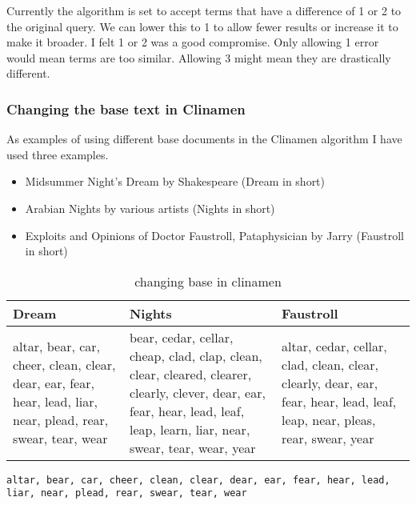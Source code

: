 Currently the algorithm is set to accept terms that have a difference of 1 or 2 to the original query. We can lower this to 1 to allow fewer results or increase it to make it broader. I felt 1 or 2 was a good compromise. Only allowing 1 error would mean terms are too similar. Allowing 3 might mean they are drastically different.



\subsubsection{Changing the base text in Clinamen}
\label{s:basetext}

As examples of using different base documents in the Clinamen algorithm I have used three examples. 

\begin{itemize}
  \item Midsummer Night's Dream by Shakespeare (Dream in short)
  \item Arabian Nights by various artists (Nights in short)
  \item Exploits and Opinions of Doctor Faustroll, Pataphysician by Jarry (Faustroll in short)
\end{itemize}

\begin{table}
  \centering
  \begin{tabu}{X[l]X[1.5,l]X[l]}
  \toprule
  \textbf{Dream} & \textbf{Nights} & \textbf{Faustroll}\\
  \midrule
  altar, bear, car, cheer, clean, clear, dear, ear, fear, hear, lead, liar, near, plead, rear, swear, tear, wear & bear, cedar, cellar, cheap, clad, clap, clean, clear, cleared, clearer, clearly, clever, dear, ear, fear, hear, lead, leaf, leap, learn, liar, near, swear, tear, wear, year & altar, cedar, cellar, clad, clean, clear, clearly, dear, ear, fear, hear, lead, leaf, leap, near, pleas, rear, swear, year\\
  \bottomrule
  \end{tabu}
\caption[Changing base in clinamen]{changing base in clinamen}
\label{tab:baseclear}
\end{table}

\begin{verbatim}
altar, bear, car, cheer, clean, clear, dear, ear, fear, hear, lead, liar, near, plead, rear, swear, tear, wear
\end{verbatim}



